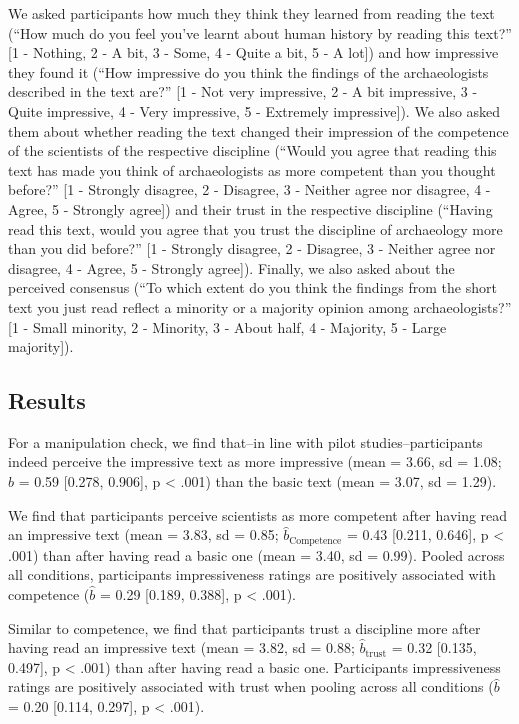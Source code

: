 \documentclass[
  doc,floatsintext]{apa6}
\begin{document}
We asked participants how much they think they learned from reading the text (``How much do you feel you've learnt about human history by reading this text?'' {[}1 - Nothing, 2 - A bit, 3 - Some, 4 - Quite a bit, 5 - A lot{]}) and how impressive they found it (``How impressive do you think the findings of the archaeologists described in the text are?'' {[}1 - Not very impressive, 2 - A bit impressive, 3 - Quite impressive, 4 - Very impressive, 5 - Extremely impressive{]}). We also asked them about whether reading the text changed their impression of the competence of the scientists of the respective discipline (``Would you agree that reading this text has made you think of archaeologists as more competent than you thought before?'' {[}1 - Strongly disagree, 2 - Disagree, 3 - Neither agree nor disagree, 4 - Agree, 5 - Strongly agree{]}) and their trust in the respective discipline (``Having read this text, would you agree that you trust the discipline of archaeology more than you did before?'' {[}1 - Strongly disagree, 2 - Disagree, 3 - Neither agree nor disagree, 4 - Agree, 5 - Strongly agree{]}). Finally, we also asked about the perceived consensus (``To which extent do you think the findings from the short text you just read reflect a minority or a majority opinion among archaeologists?'' {[}1 - Small minority, 2 - Minority, 3 - About half, 4 - Majority, 5 - Large majority{]}).

\hypertarget{results}{%
\subsection{Results}\label{results}}

For a manipulation check, we find that--in line with pilot studies--participants indeed perceive the impressive text as more impressive (mean = 3.66, sd = 1.08; \(\hat{b}\) = 0.59 {[}0.278, 0.906{]}, p \textless{} .001) than the basic text (mean = 3.07, sd = 1.29).

We find that participants perceive scientists as more competent after having read an impressive text (mean = 3.83, sd = 0.85; \(\hat{b}_{\text{Competence}}\) = 0.43 {[}0.211, 0.646{]}, p \textless{} .001) than after having read a basic one (mean = 3.40, sd = 0.99). Pooled across all conditions, participants impressiveness ratings are positively associated with competence (\(\hat{b}\) = 0.29 {[}0.189, 0.388{]}, p \textless{} .001).

Similar to competence, we find that participants trust a discipline more after having read an impressive text (mean = 3.82, sd = 0.88; \(\hat{b}_{\text{trust}}\) = 0.32 {[}0.135, 0.497{]}, p \textless{} .001) than after having read a basic one. Participants impressiveness ratings are positively associated with trust when pooling across all conditions (\(\hat{b}\) = 0.20 {[}0.114, 0.297{]}, p \textless{} .001).
\end{document}
